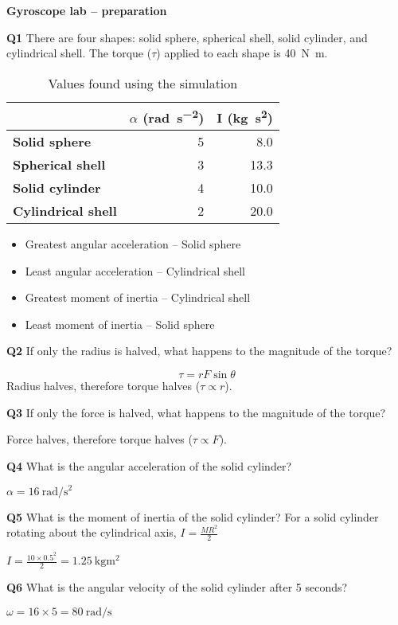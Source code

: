 \documentclass[review]{elsarticle}
\begin{document}
\pagestyle{fancy}
\fancyhead[R]{\today}



\begin{center}
    \textbf{\Large Gyroscope lab -- preparation}
\end{center}
\begin{tcolorbox}
    \textbf{Q1} There are four shapes: solid sphere, spherical shell, solid cylinder, and cylindrical shell. The torque ($\tau$) applied to each shape is \SI{40}{\newton\meter}.
\end{tcolorbox}
\begin{table}[H]
\centering
\begin{tabular}{l|rr}
 & \multicolumn{1}{l}{\textbf{$\alpha$ (\unit{\radian\per\second\squared})}} & \multicolumn{1}{l}{\textbf{I (\unit{\kilogram\second\squared})}} \\ \hline
\textbf{Solid sphere} & 5 & 8.0 \\
\textbf{Spherical shell} & 3 & 13.3 \\
\textbf{Solid cylinder} & 4 & 10.0 \\
\textbf{Cylindrical shell} & 2 & 20.0
\end{tabular}
\caption{Values found using the simulation}
\label{tab:my-table}
\end{table}
\begin{itemize}
    \item Greatest angular acceleration -- Solid sphere
    \item Least angular acceleration -- Cylindrical shell
    \item Greatest moment of inertia -- Cylindrical shell
    \item Least moment of inertia -- Solid sphere
\end{itemize}
\begin{tcolorbox}
\textbf{Q2} If only the radius is halved, what happens to the magnitude of the torque?
\end{tcolorbox}
\begin{equation}
    \tau = rF\sin\theta
\end{equation}
Radius halves, therefore torque halves ($\tau \propto r$).
\begin{tcolorbox}
\textbf{Q3} If only the force is halved, what happens to the magnitude of the torque?
\end{tcolorbox}
Force halves, therefore torque halves ($\tau \propto F$).
\begin{tcolorbox}
\textbf{Q4} What is the angular acceleration of the solid cylinder?
\end{tcolorbox}
$\alpha=\SI{16}{\radian\per\second\squared}$

\begin{tcolorbox}
\textbf{Q5} What is the moment of inertia of the solid cylinder? For a solid cylinder rotating about the cylindrical axis, $I=\frac{MR^2}{2}$
\end{tcolorbox}
$I=\frac{10\times0.5^2}{2}=\SI{1.25}{\kilogram\meter\squared}$

\begin{tcolorbox}
\textbf{Q6} What is the angular velocity of the solid cylinder after 5 seconds?
\end{tcolorbox}
$\omega=16\times5=\SI{80}{\radian\per\second}$
\end{document}
